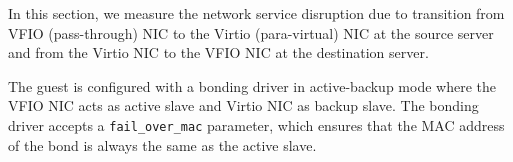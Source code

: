 



In this section, we measure the network service disruption
due to transition from VFIO (pass-through) NIC to the 
Virtio (para-virtual) NIC 
at the source server and from the Virtio NIC to the VFIO
NIC at the destination server.


The guest is configured with a bonding driver in 
active-backup mode where the VFIO NIC acts as 
active slave and Virtio NIC as 
backup slave. The bonding driver accepts a
\texttt{fail\_over\_mac} parameter, which
ensures that the
MAC address of the bond is always the same as the active
slave. 

